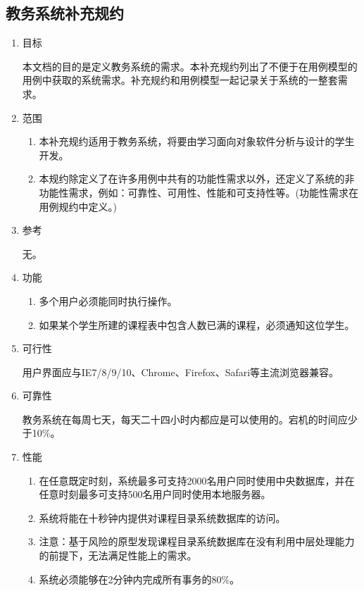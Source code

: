 \subsection{教务系统补充规约}

\begin{enumerate}
  \item 目标
  
  \CJKindent 本文档的目的是定义教务系统的需求。本补充规约列出了不便于在用例模型的用例中获取的系统需求。补充规约和用例模型一起记录关于系统的一整套需求。
  
  \item 范围
  
  \begin{enumerate}
    \item 本补充规约适用于教务系统，将要由学习面向对象软件分析与设计的学生开发。
    \item 本规约除定义了在许多用例中共有的功能性需求以外，还定义了系统的非功能性需求，例如：可靠性、可用性、性能和可支持性等。(功能性需求在用例规约中定义。)
  \end{enumerate}
  
  \item 参考
  
  无。
  
  \item 功能
  
  \begin{enumerate}
    \item 多个用户必须能同时执行操作。
    \item 如果某个学生所建的课程表中包含人数已满的课程，必须通知这位学生。
  \end{enumerate}
  
  \item 可行性
  
  \CJKindent 用户界面应与IE7/8/9/10、Chrome、Firefox、Safari等主流浏览器兼容。
  
  \item 可靠性
  
  \CJKindent 教务系统在每周七天，每天二十四小时内都应是可以使用的。宕机的时间应少于10\%。
  
  \item 性能
  
  \begin{enumerate}
    \item 在任意既定时刻，系统最多可支持2000名用户同时使用中央数据库，并在任意时刻最多可支持500名用户同时使用本地服务器。
    \item 系统将能在十秒钟内提供对课程目录系统数据库的访问。
    \item 注意：基于风险的原型发现课程目录系统数据库在没有利用中层处理能力的前提下，无法满足性能上的需求。
    \item 系统必须能够在2分钟内完成所有事务的80\%。
  \end{enumerate}
  

\end{enumerate}

